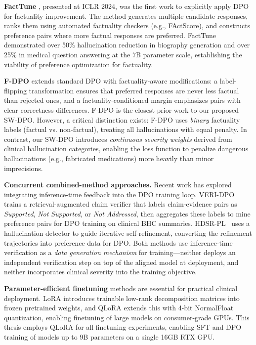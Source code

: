 \documentclass[12pt,a4paper,oneside]{report}
\begin{document}
\textbf{FactTune} \cite{tian2024facttune}, presented at ICLR 2024, was the first work to explicitly apply DPO for factuality improvement. The method generates multiple candidate responses, ranks them using automated factuality checkers (e.g., FActScore), and constructs preference pairs where more factual responses are preferred. FactTune demonstrated over 50\% hallucination reduction in biography generation and over 25\% in medical question answering at the 7B parameter scale, establishing the viability of preference optimization for factuality.

\textbf{F-DPO} \cite{chaduvula2026fdpo} extends standard DPO with factuality-aware modifications: a label-flipping transformation ensures that preferred responses are never less factual than rejected ones, and a factuality-conditioned margin emphasizes pairs with clear correctness differences. F-DPO is the closest prior work to our proposed SW-DPO. However, a critical distinction exists: F-DPO uses \textit{binary} factuality labels (factual vs. non-factual), treating all hallucinations with equal penalty. In contrast, our SW-DPO introduces \textit{continuous severity weights} derived from clinical hallucination categories, enabling the loss function to penalize dangerous hallucinations (e.g., fabricated medications) more heavily than minor imprecisions.

\textbf{Concurrent combined-method approaches.} Recent work has explored integrating inference-time feedback into the DPO training loop. VERI-DPO~\cite{liu2025veridpo} trains a retrieval-augmented claim verifier that labels claim-evidence pairs as \textit{Supported}, \textit{Not Supported}, or \textit{Not Addressed}, then aggregates these labels to mine preference pairs for DPO training on clinical BHC summaries. HDSR-PL~\cite{fang2025hdsrpl} uses a hallucination detector to guide iterative self-refinement, converting the refinement trajectories into preference data for DPO. Both methods use inference-time verification as a \textit{data generation mechanism} for training---neither deploys an independent verification step on top of the aligned model at deployment, and neither incorporates clinical severity into the training objective.

\textbf{Parameter-efficient finetuning} methods are essential for practical clinical deployment. LoRA \cite{hu2022lora} introduces trainable low-rank decomposition matrices into frozen pretrained weights, and QLoRA \cite{dettmers2023qlora} extends this with 4-bit NormalFloat quantization, enabling finetuning of large models on consumer-grade GPUs. This thesis employs QLoRA for all finetuning experiments, enabling SFT and DPO training of models up to 9B parameters on a single 16GB RTX GPU.
\end{document}
